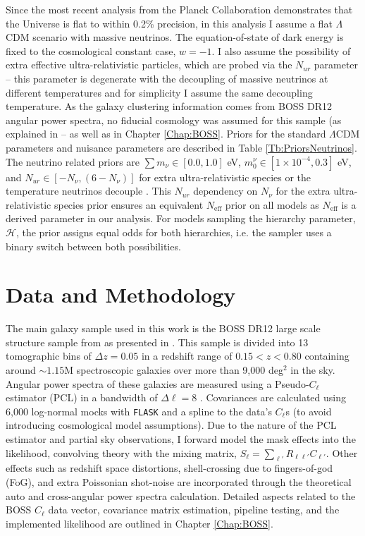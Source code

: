 Since the most recent analysis from the Planck Collaboration demonstrates that the Universe is flat to within 0.2\% precision, in this analysis I assume a flat $\Lambda$CDM scenario with massive neutrinos. The equation-of-state of dark energy is fixed to the cosmological constant case, $w=-1$. I also assume the possibility of extra effective ultra-relativistic particles, which are probed via the $N_{ur}$ parameter -- this parameter is degenerate with the decoupling of massive neutrinos at different temperatures and for simplicity I assume the same decoupling temperature. As the galaxy clustering information comes from BOSS DR12 angular power spectra, no fiducial cosmology was assumed for this sample (as explained in \cite{2018LoureiroBOSS} -- as well as in Chapter \ref{Chap:BOSS}. Priors for the standard $\Lambda$CDM parameters and nuisance parameters are described in Table \ref{Tb:PriorsNeutrinos}. The neutrino related priors are $\sum m_{\nu} \in [0.0, 1.0]$ eV, $m_{0}^{\nu} \in [1\times 10^{-4},0.3]$ eV, and $N_{ur} \in [-N_{\nu},(6-N_{\nu})]$ for extra ultra-relativistic species or the temperature neutrinos decouple \citep{2012Julien-Deg}. This $N_{ur}$ dependency on $N_{\nu}$ for the extra ultra-relativistic species prior ensures an equivalent $N_{\text{eff}}$ prior on all models as $N_{\text{eff}}$ is a derived parameter in our analysis. For models sampling the hierarchy parameter, $\mathcal{H}$, the prior assigns equal odds for both hierarchies, i.e. the sampler uses a binary switch between both possibilities.


\section{Data and Methodology}
The main galaxy sample used in this work is the BOSS DR12 large scale structure sample from \cite{BOSSCatalogue2016} as presented in \cite[][and in Chapter \ref{Chap:BOSS}]{2018LoureiroBOSS}. This sample is divided into 13 tomographic bins of $\Delta z = 0.05$ in a redshift range of $0.15 < z < 0.80$ containing around $\sim 1.15$M spectroscopic galaxies over more than 9,000 deg$^2$ in the sky. Angular power spectra of these galaxies are measured using a Pseudo-$C_{\ell}$ estimator (PCL) \citep[][ -- see Section \ref{Sec:Measurements}]{Thomas2011,Peebles1973,Efstat2004} in a bandwidth of $\Delta\ell =8$ \citep{2018LoureiroBOSS}. Covariances are calculated using 6,000 log-normal mocks with \texttt{FLASK} \citep{Flask2016} and a spline to the data's $C_{\ell}$s (to avoid introducing cosmological model assumptions). Due to the nature of the PCL estimator and partial sky observations, I forward model the mask effects into the likelihood, convolving theory with the mixing matrix, $S_{\ell} = \sum_{\ell'}R_{\ell \ell'} C_{\ell'}$. Other effects such as redshift space distortions, shell-crossing due to fingers-of-god (FoG), and extra Poissonian shot-noise are incorporated through the theoretical auto and cross-angular power spectra calculation. Detailed aspects related to the BOSS $C_{\ell}$ data vector, covariance matrix estimation, pipeline testing, and the implemented likelihood are outlined in Chapter \ref{Chap:BOSS}.

